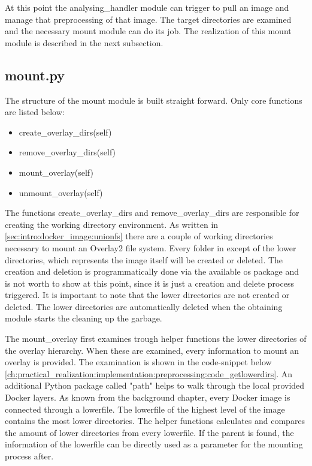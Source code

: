 

At this point the analysing\_handler module can trigger to pull an image and manage that preprocessing of that image. The target directories are examined and the necessary mount module can do its job. The realization of this mount module is described in the next subsection.	

\subsection{mount.py}	
\label{ch:practical_realization:implementation:mount}
The structure of the mount module is built straight forward. Only core functions are listed below:
\begin{itemize}
\item create\_overlay\_dirs(self)
\item remove\_overlay\_dirs(self)
\item mount\_overlay(self)
\item unmount\_overlay(self)
\end{itemize}
The functions create\_overlay\_dirs and remove\_overlay\_dirs are responsible for creating the working directory environment. As written in \ref{sec:intro:docker_image:unionfs} there are a couple of working directories necessary to mount an Overlay2 file system.
Every folder in except of the lower directories, which represents the image itself will be created or deleted. The creation and deletion is programmatically done via the available os package and is not worth to show at this point, since it is just a creation and delete process triggered. It is important to note that the lower directories are not created or deleted. The lower directories are automatically deleted when the obtaining module starts the cleaning up the garbage.
 
The mount\_overlay first examines trough helper functions the lower directories of the overlay hierarchy. When these are examined, every information to mount an overlay is provided. The examination is shown in the code-snippet below \ref{ch:practical_realization:implementation:preprocessing:code_getlowerdirs}.
An additional Python package called "path" helps to walk through the local provided Docker layers.
As known from the background chapter, every Docker image is connected through a lowerfile.
The lowerfile of the highest level of the image contains the most lower directories.
The helper functions calculates and compares the amount of lower directories from every lowerfile.
If the parent is found, the information of the lowerfile can be directly used as a parameter for the mounting process after.


